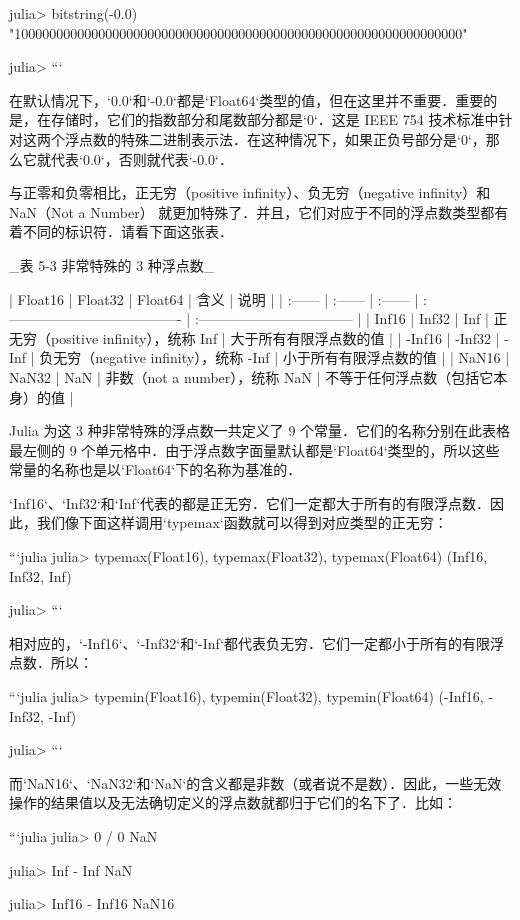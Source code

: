 julia> bitstring(-0.0)
"1000000000000000000000000000000000000000000000000000000000000000"

julia> 
```

在默认情况下，`0.0`和`-0.0`都是`Float64`类型的值，但在这里并不重要．重要的是，在存储时，它们的指数部分和尾数部分都是`0`．这是 IEEE 754 技术标准中针对这两个浮点数的特殊二进制表示法．在这种情况下，如果正负号部分是`0`，那么它就代表`0.0`，否则就代表`-0.0`．

与正零和负零相比，正无穷（positive infinity）、负无穷（negative infinity）和 NaN（Not a Number） 就更加特殊了．并且，它们对应于不同的浮点数类型都有着不同的标识符．请看下面这张表．

_表 5-3 非常特殊的 3 种浮点数_

| Float16 | Float32 | Float64 | 含义                                   | 说明                               |
| :------ | :------ | :------ | :------------------------------------- | :--------------------------------- |
| Inf16   | Inf32   | Inf     | 正无穷（positive infinity），统称 Inf  | 大于所有有限浮点数的值             |
| -Inf16  | -Inf32  | -Inf    | 负无穷（negative infinity），统称 -Inf | 小于所有有限浮点数的值             |
| NaN16   | NaN32   | NaN     | 非数（not a number），统称 NaN         | 不等于任何浮点数（包括它本身）的值 |

Julia 为这 3 种非常特殊的浮点数一共定义了 9 个常量．它们的名称分别在此表格最左侧的 9 个单元格中．由于浮点数字面量默认都是`Float64`类型的，所以这些常量的名称也是以`Float64`下的名称为基准的．

`Inf16`、`Inf32`和`Inf`代表的都是正无穷．它们一定都大于所有的有限浮点数．因此，我们像下面这样调用`typemax`函数就可以得到对应类型的正无穷：

```julia
julia> typemax(Float16), typemax(Float32), typemax(Float64)
(Inf16, Inf32, Inf)

julia> 
```

相对应的，`-Inf16`、`-Inf32`和`-Inf`都代表负无穷．它们一定都小于所有的有限浮点数．所以：

```julia
julia> typemin(Float16), typemin(Float32), typemin(Float64)
(-Inf16, -Inf32, -Inf)

julia> 
```

而`NaN16`、`NaN32`和`NaN`的含义都是非数（或者说不是数）．因此，一些无效操作的结果值以及无法确切定义的浮点数就都归于它们的名下了．比如：

```julia
julia> 0 / 0
NaN

julia> Inf - Inf
NaN

julia> Inf16 - Inf16
NaN16

